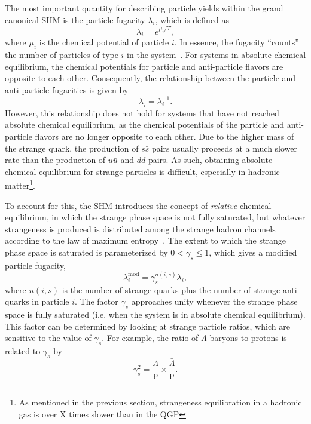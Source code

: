 The most important quantity for describing particle yields within the grand canonical SHM is the particle fugacity $\lambda_i$, which is defined as
%
\begin{equation}
    \label{eq:particle_fugacity}
    \lambda_i = e^{\mu_i/T},
\end{equation}
%
where $\mu_i$ is the chemical potential of particle $i$. In essence, the fugacity ``counts'' the number of particles of type $i$ in the system~\cite{Strangeness}. For systems in absolute chemical equilibrium, the chemical potentials for particle and anti-particle flavors are opposite to each other. Consequently, the relationship between the particle and anti-particle fugacities is given by
%
\begin{equation}
    \lambda_{\bar{i}} = \lambda_i^{-1}.
\end{equation}
%
However, this relationship does not hold for systems that have not reached absolute chemical equilibrium, as the chemical potentials of the particle and anti-particle flavors are no longer opposite to each other. Due to the higher mass of the strange quark, the production of $s\bar{s}$ pairs usually proceeds at a much slower rate than the production of $u\bar{u}$ and $d\bar{d}$ pairs. As such, obtaining absolute chemical equilibrium for strange particles is difficult, especially in hadronic matter\footnote{As mentioned in the previous section, strangeness equilibration in a hadronic gas is over X times slower than in the QGP}. 

To account for this, the SHM introduces the concept of \textit{relative} chemical equilibrium, in which the strange phase space is not fully saturated, but whatever strangeness is produced is distributed among the strange hadron channels according to the law of maximum entropy~\cite{9212210hepph}. The extent to which the strange phase space is saturated is parameterized by $0 < \gamma_s \leq 1$, which gives a modified particle fugacity,
%
\begin{equation}
    \label{eq:modified_fugacity}
    \lambda_i^{\text{mod}} = \gamma_s^{n(i, s)} \lambda_i,
\end{equation}
%
where $n(i, s)$ is the number of strange quarks plus the number of strange anti-quarks in particle $i$. The factor $\gamma_s$ approaches unity whenever the strange phase space is fully saturated (i.e. when the system is in absolute chemical equilibrium). This factor can be determined by looking at strange particle ratios, which are sensitive to the value of $\gamma_s$. For example, the ratio of $\Lambda$ baryons to protons is related to $\gamma_s$ by
%
\begin{equation}
    \label{eq:gamma_s}
    \gamma_s^2 = \frac{\Lambda}{\text{p}} \times \frac{\bar{\Lambda}}{\bar{\text{p}}}.
\end{equation}
%

